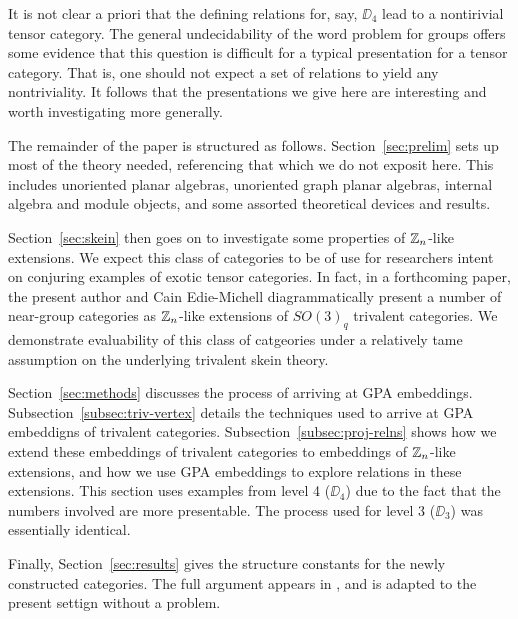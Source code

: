 It is not clear a priori that the defining relations for, say, $\DD_4$ lead to a nontirivial tensor category.
The general undecidability of the word problem for groups offers some evidence that this question is difficult
for a typical presentation for a tensor category.
That is, one should not expect a set of relations to yield any nontriviality.
It follows that the presentations we give here are interesting and worth investigating more generally.

The remainder of the paper is structured as follows.
Section~\ref{sec:prelim} sets up most of the theory needed, referencing that which we do not exposit here.
This includes unoriented planar algebras, unoriented graph planar algebras, 
internal algebra and module objects, and some assorted theoretical devices and results.

Section~\ref{sec:skein} then goes on to investigate some properties of $\mathbb{Z}_n$-like extensions.
We expect this class of categories to be of use for researchers intent on conjuring 
examples of exotic tensor categories.
In fact, in a forthcoming paper, the present author and Cain Edie-Michell diagrammatically
present a number of near-group categories as $\mathbb{Z}_n$-like extensions of $SO(3)_q$ trivalent categories.
We demonstrate evaluability of this class of catgeories under a relatively tame assumption on the
underlying trivalent skein theory.

Section~\ref{sec:methods} discusses the process of arriving at GPA embeddings.
Subsection~\ref{subsec:triv-vertex} details the techniques used to arrive at GPA embeddigns of 
trivalent categories. 
Subsection~\ref{subsec:proj-relns} shows how we extend these embeddings of trivalent categories
to embeddings of $\mathbb{Z}_n$-like extensions, and how we use GPA embeddings to explore 
relations in these extensions.
This section uses examples from level 4 ($\DD_4$) due to the fact that the numbers involved are more presentable.
The process used for level 3 ($\DD_3$) was essentially identical.

Finally, Section~\ref{sec:results} gives the structure constants for the newly constructed categories.
The full argument appears in \cite{cain_noah_hans}, and is adapted to the present settign without a problem.